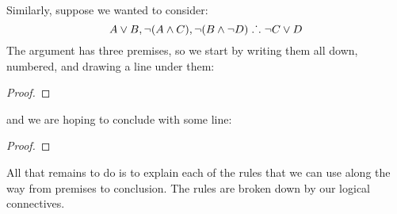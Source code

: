 Similarly, suppose we wanted to consider:
$$A\vee B, \neg (A\wedge C), \neg (B \wedge \neg D) \mathrel{\ldotp\dot{}\,\ldotp} \neg C\vee D$$
The argument has three premises, so we start by writing them all down, numbered, and drawing a line under them:
\begin{proof}
\end{proof}
and we are hoping to conclude with some line:
\begin{proof}
\end{proof}
All that remains to do is to explain each of the rules that we can use along the way from premises to conclusion. The rules are broken down by our logical connectives.

%
%
%

